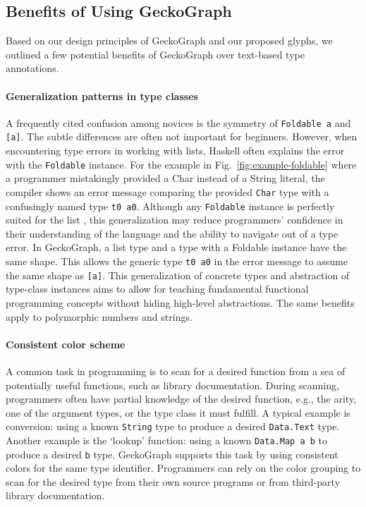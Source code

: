 \subsection{Benefits of Using GeckoGraph}\label{sec:benefits}
Based on our design principles of GeckoGraph and our proposed glyphs, we outlined a few potential benefits of GeckoGraph over text-based type annotations. 

\paragraph{Generalization patterns in type classes}
A frequently cited confusion among novices is the symmetry of \texttt{Foldable a} and \texttt{[a]}. The subtle differences are often not important for beginners. However, when encountering type errors in working with lists, Haskell often explains the error with the \texttt{Foldable} instance. For the example in Fig.~\ref{fig:example-foldable} where a programmer mistakingly provided a Char instead of a String literal, the compiler shows an error message comparing the provided \texttt{Char} type with a confusingly named type \texttt{t0 a0}. Although any \texttt{Foldable} instance is perfectly suited for the list \cite{Waldmann2018-hu}, this generalization may reduce programmers' confidence in their understanding of the language and the ability to navigate out of a type error. In GeckoGraph, a list type and a type with a Foldable instance have the same shape. This allows the generic type \texttt{t0 a0} in the error message to assume the same shape as \texttt{[a]}. This generalization of concrete types and abstraction of type-class instances aims to allow for teaching fundamental functional programming concepts without hiding high-level abstractions. The same benefits apply to polymorphic numbers and strings.


\paragraph{Consistent color scheme}\label{par:color-scheme}
A common task in programming is to scan for a desired function from a sea of potentially useful functions, such as library documentation. During scanning, programmers often have partial knowledge of the desired function, e.g., the arity, one of the argument types, or the type class it must fulfill.  A typical example is conversion: using a known \texttt{String} type to produce a desired \texttt{Data.Text}  type. Another example is the `lookup' function: using a known \texttt{Data.Map a b} to produce a desired \texttt{b} type. GeckoGraph supports this task by using consistent colors for the same type identifier. Programmers can rely on the color grouping to scan for the desired type from their own source programs or from third-party library documentation.

